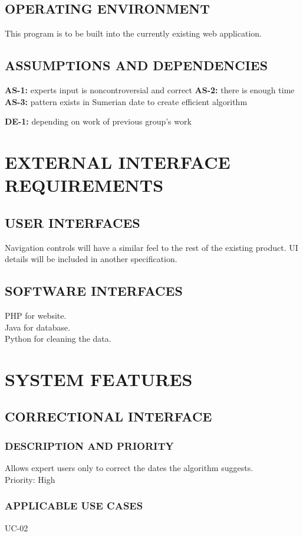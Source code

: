 \documentclass[11pt]{article}
\begin{document}
\subsection{OPERATING ENVIRONMENT}
This program is to be built into the currently existing web application.

\subsection{ASSUMPTIONS AND DEPENDENCIES}
\textbf{AS-1:} experts input is noncontroversial and correct
\textbf{AS-2:} there is enough time
\textbf{AS-3:} pattern exists in Sumerian date to create efficient algorithm

\textbf{DE-1:} depending on work of previous group’s work


\section{EXTERNAL INTERFACE REQUIREMENTS}
\subsection{USER INTERFACES}
Navigation controls will have a similar feel to the rest of the existing product.
UI details will be included in another specification.

\subsection{SOFTWARE INTERFACES}
PHP for website.\\
Java for database.\\
Python for cleaning the data.\\

\section{SYSTEM FEATURES}

\subsection{CORRECTIONAL INTERFACE}
\subsubsection{DESCRIPTION AND PRIORITY}
Allows expert users only to correct the dates the algorithm suggests.\\
Priority: High
\subsubsection{APPLICABLE USE CASES}
UC-02
\end{document}
